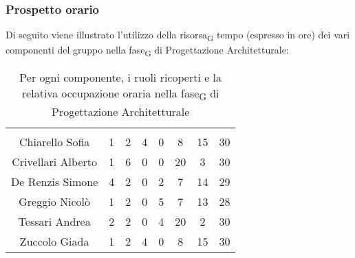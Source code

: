 \subsubsection{Prospetto orario}
Di seguito viene illustrato l'utilizzo della \gls{risorsa}\textsubscript{G} tempo (espresso in ore) dei vari componenti del gruppo nella \gls{fase}\textsubscript{G} di Progettazione Architetturale:

\begin{table}[H]
	\begin{center}
		\begin{tabular}{c
				!{\color[HTML]{9b240a}\vrule width 1pt}
				cccccc
				!{\color[HTML]{9b240a}\vrule width 1pt}	
				c}
			\rowcolorhead
			 &  &  &  &  &  &  &  \\
			
			Chiarello Sofia & 1 & 2 & 4 & 0 & 8 & 15 & 30\\
			Crivellari Alberto & 1 & 6 & 0 & 0 & 20 & 3 & 30\\
			De Renzis Simone & 4 & 2 & 0 & 2 & 7 & 14 & 29\\
			Greggio Nicolò & 1 & 2 & 0 & 5 & 7 & 13 & 28\\
			Tessari Andrea & 2 & 2 & 0 & 4 & 20 & 2 & 30\\
			Zuccolo Giada & 1 & 2 & 4 & 0 & 8 & 15 & 30\\
		\end{tabular}
		\caption[Occupazione oraria Progettazione Architetturale]{Per ogni componente, i ruoli ricoperti e la relativa occupazione oraria nella \gls{fase}\textsubscript{G} di Progettazione Architetturale}
	\end{center}
\end{table}


